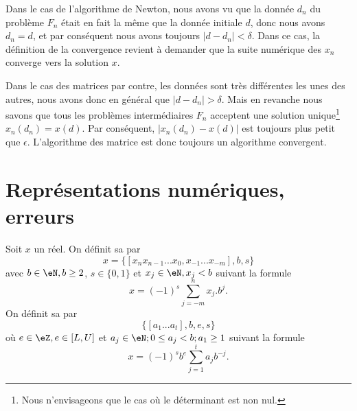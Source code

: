 \begin{remark}		\label{RemConvAlgoNewton}
Dans le cas de l'algorithme de Newton, nous avons vu que la donnée $d_n$ du problème $F_n$ était en fait la même que la donnée initiale $d$, donc nous avons $d_n=d$, et par conséquent nous avons toujours $| d-d_n |<\delta$. Dans ce cas, la définition de la convergence revient à demander que la suite numérique des $x_n$ converge vers la solution $x$.
\end{remark}

\begin{remark}
Dans le cas des matrices par contre, les données sont très différentes les unes des autres, nous avons donc en général que $| d-d_n |>\delta$. Mais en revanche nous savons que tous les problèmes intermédiaires $F_n$ acceptent une solution unique\footnote{Nous n'envisageons que le cas où le déterminant est non nul.} $x_n(d_n)=x(d)$. Par conséquent, $| x_n(d_n)-x(d) |$ est toujours plus petit que $\epsilon$. L'algorithme des matrice est donc toujours un algorithme convergent.
\end{remark}

\section{Représentations numériques, erreurs}

\begin{definition}
	Soit $x$ un réel. On définit sa  par 
	\begin{equation}
		x=\{[x_nx_{n-1}...x_0,x_{-1}...x_{-m}], b, s\}
	\end{equation}
	avec  $b\in\eN, b\geq2$, $s\in\{0,1\}$ et $x_j\in\eN,x_j<b$ suivant la formule
	\begin{equation}
		x=(-1)^{s}\sum_{j=-m}^nx_j.b^j.
	\end{equation}
	On définit sa  par 
	\begin{equation}
		\{[a_1...a_t],b,e,s\}
	\end{equation}
	où $e\in\eZ,e\in[L,U]$ et $a_j\in\eN;0\leq a_j<b; a_1\geq1$ suivant la formule
	\begin{equation}		\label{EqRepreFlotNOrm}
		x=(-1)^sb^e\sum_{j=1}^ta_jb^{-j}.
	\end{equation}
\end{definition}

